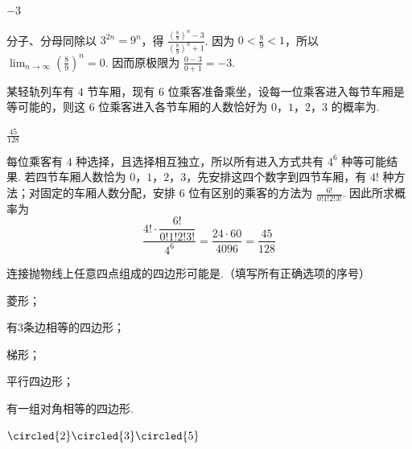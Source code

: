 \begin{answer}
\(-3\)
\end{answer}

\begin{solution}
分子、分母同除以 \(3^{2n}=9^n\)，得 \(\frac{\left(\frac89\right)^n-3}{\left(\frac89\right)^n+1}\).
因为 \(0<\frac89<1\)，所以 \(\displaystyle\lim_{n\to\infty}\left(\frac89\right)^n=0\). 因而原极限为 \(\frac{0-3}{0+1}=-3\).
\end{solution}

\begin{problem}
某轻轨列车有 \(4\) 节车厢，现有 \(6\) 位乘客准备乘坐，设每一位乘客进入每节车厢是等可能的，则这 \(6\) 位乘客进入各节车厢的人数恰好为 \(0\)，\(1\)，\(2\)，\(3\) 的概率为\fillinblank{}.
\end{problem}

\begin{answer}
\(\frac{45}{128}\)
\end{answer}

\begin{solution}
每位乘客有 \(4\) 种选择，且选择相互独立，所以所有进入方式共有 \(4^6\) 种等可能结果. 若四节车厢人数恰为 \(0\)，\(1\)，\(2\)，\(3\)，先安排这四个数字到四节车厢，有 \(4!\) 种方法；对固定的车厢人数分配，安排 \(6\) 位有区别的乘客的方法为
\(\frac{6!}{0!1!2!3!}\).
因此所求概率为
\[
\frac{4!\cdot\dfrac{6!}{0!1!2!3!}}{4^6}
=\frac{24\cdot60}{4096}
=\frac{45}{128}
\]
\end{solution}

\begin{problem}
连接抛物线上任意四点组成的四边形可能是\fillinblank{}.（填写所有正确选项的序号）

\begin{circlelist}
\item 菱形；
\item 有\(3\)条边相等的四边形；
\item 梯形；
\item 平行四边形；
\item 有一组对角相等的四边形.
\end{circlelist}
\end{problem}

\begin{answer}
\(\circled{2}\circled{3}\circled{5}\)
\end{answer}

